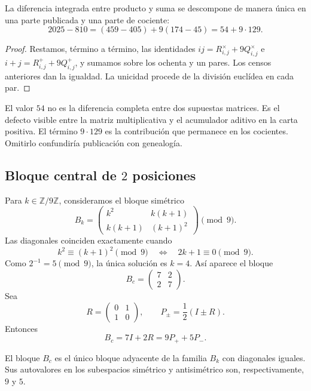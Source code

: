 \begin{theorem}
\label{p12-83-c1-s1:thm:app-separacion-exceso}
La diferencia integrada entre producto y suma se descompone de manera única
en una parte publicada y una parte de cociente:
\[
 \boxed{
  2025-810
  =(459-405)+9(174-45)
  =54+9\cdot129.}
\]
\end{theorem}

\begin{proof}
Restamos, término a término, las identidades
\(ij=R^\times_{i,j}+9Q^\times_{i,j}\) e
\(i+j=R^+_{i,j}+9Q^+_{i,j}\), y sumamos sobre los ochenta y un pares. Los
censos anteriores dan la igualdad. La unicidad procede de la división
euclídea en cada par.
\end{proof}

El valor \(54\) no es la diferencia completa entre dos supuestas matrices.
Es el defecto visible entre la matriz multiplicativa y el acumulador aditivo
en la carta positiva. El término \(9\cdot129\) es la contribución
que permanece en los cocientes. Omitirlo confundiría publicación con
genealogía.

\subsection{Bloque central de \(2\) posiciones}

Para \(k\in\mathbb Z/9\mathbb Z\), consideramos el bloque simétrico
\[
 B_k=
 \begin{pmatrix}
  k^2&k(k+1)\\
  k(k+1)&(k+1)^2
 \end{pmatrix}\pmod9.
\]
Las diagonales coinciden exactamente cuando
\[
 k^2\equiv(k+1)^2\pmod9
 \quad\Longleftrightarrow\quad
 2k+1\equiv0\pmod9.
\]
Como \(2^{-1}=5\pmod9\), la única solución es \(k=4\). Así aparece el
bloque
\[
 B_c=
 \begin{pmatrix}7&2\\2&7\end{pmatrix}.
\]
Sea
\[
 R=\begin{pmatrix}0&1\\1&0\end{pmatrix},
 \qquad
 P_\pm=\frac12(I\pm R).
\]
Entonces
\[
 B_c=7I+2R=9P_++5P_-.
\]

\begin{theorem}
\label{p12-83-c1-s1:thm:app-bloque-central}
El bloque \(B_c\) es el único bloque adyacente de la familia \(B_k\) con
diagonales iguales. Sus autovalores en los subespacios simétrico y
antisimétrico son, respectivamente, \(9\) y \(5\).
\end{theorem}

